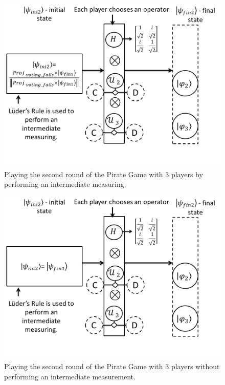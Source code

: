 \begin{figure}[h]
\centering 
\includegraphics[scale=0.35]{Figures/architecture/esquema/Slide2.png}
\caption{Playing the second round of the Pirate Game with 3 players by performing an intermediate measuring. }
\label{fig:pg_architecture3players_2measure}
\end{figure}

\begin{figure}[h]
\centering 
\includegraphics[scale=0.35]{Figures/architecture/esquema/Slide3.png}
\caption{Playing the second round of the Pirate Game with 3 players without performing an intermediate measurement. }
\label{fig:pg_architecture3players_2nomeasure}
\end{figure}

